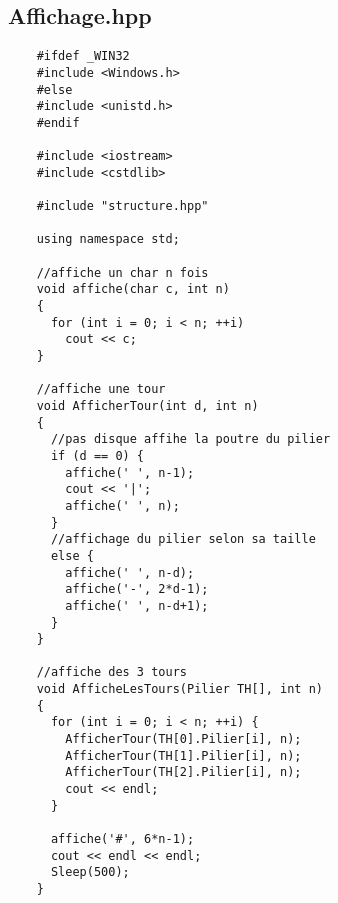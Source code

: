 \subsection*{Affichage.hpp}
\begin{verbatim}
    #ifdef _WIN32
    #include <Windows.h>
    #else
    #include <unistd.h>
    #endif
    
    #include <iostream>
    #include <cstdlib>
    
    #include "structure.hpp"
    
    using namespace std;
    
    //affiche un char n fois
    void affiche(char c, int n)
    {
      for (int i = 0; i < n; ++i)
        cout << c;
    }
    
    //affiche une tour
    void AfficherTour(int d, int n)
    {
      //pas disque affihe la poutre du pilier
      if (d == 0) {
        affiche(' ', n-1);
        cout << '|';
        affiche(' ', n);
      }
      //affichage du pilier selon sa taille
      else {
        affiche(' ', n-d);
        affiche('-', 2*d-1);
        affiche(' ', n-d+1);
      }
    }
    
    //affiche des 3 tours
    void AfficheLesTours(Pilier TH[], int n)
    {
      for (int i = 0; i < n; ++i) {
        AfficherTour(TH[0].Pilier[i], n);
        AfficherTour(TH[1].Pilier[i], n);
        AfficherTour(TH[2].Pilier[i], n);
        cout << endl;
      }
    
      affiche('#', 6*n-1);
      cout << endl << endl;
      Sleep(500);
    }
\end{verbatim}

